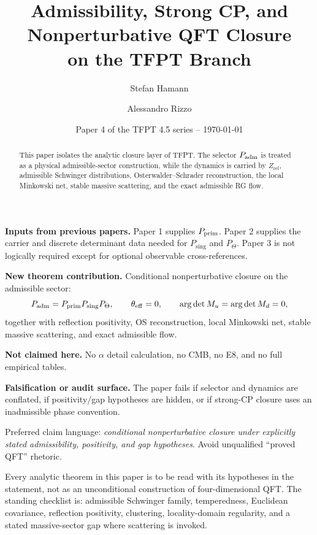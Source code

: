 \documentclass[11pt,a4paper]{article}
\title{\color{tfptblue}\textbf{Admissibility, Strong CP, and Nonperturbative QFT Closure}\\[0.35em]
{\Large on the TFPT Branch}}
\author{Stefan Hamann \and Alessandro Rizzo}
\date{{\normalsize\color{tfptgray}\sffamily Paper 4 of the TFPT 4.5 series -- \today}}
\begin{document}
\maketitle

\begin{abstract}
This paper isolates the analytic closure layer of TFPT. The selector $P_{\mathrm{adm}}$ is treated as a
physical admissible-sector construction, while the dynamics is carried by $Z_{\mathrm{rel}}$,
admissible Schwinger distributions, Osterwalder--Schrader reconstruction, the local Minkowski net,
stable massive scattering, and the exact admissible RG flow.
\end{abstract}

\begin{tfptfrontbox}
\textbf{Inputs from previous papers.} Paper 1 supplies $P_{\mathrm{prim}}$. Paper 2 supplies the carrier and
discrete determinant data needed for $P_{\mathrm{sing}}$ and $P_\Theta$. Paper 3 is not logically
required except for optional observable cross-references.

\textbf{New theorem contribution.} Conditional nonperturbative closure on the admissible sector:
\[
P_{\mathrm{adm}}=P_{\mathrm{prim}} P_{\mathrm{sing}}P_\Theta,\qquad
\theta_{\mathrm{eff}}=0,\qquad
\operatorname{arg}\det M_u=\operatorname{arg}\det M_d=0,
\]
together with reflection positivity, OS reconstruction, local Minkowski net, stable massive
scattering, and exact admissible flow.

\textbf{Not claimed here.} No $\alpha$ detail calculation, no CMB, no E8, and no full empirical
tables.

\textbf{Falsification or audit surface.} The paper fails if selector and dynamics are conflated, if
positivity/gap hypotheses are hidden, or if strong-CP closure uses an inadmissible phase convention.
\end{tfptfrontbox}

\begin{tfptwarningbox}
Preferred claim language: \emph{conditional nonperturbative closure under explicitly stated
admissibility, positivity, and gap hypotheses}. Avoid unqualified ``proved QFT'' rhetoric.
\end{tfptwarningbox}

\begin{tfptwarningbox}
Every analytic theorem in this paper is to be read with its hypotheses in the statement, not as an
unconditional construction of four-dimensional QFT. The standing checklist is: admissible
Schwinger family, temperedness, Euclidean covariance, reflection positivity, clustering,
locality-domain regularity, and a stated massive-sector gap where scattering is invoked.
\end{tfptwarningbox}
\end{document}
